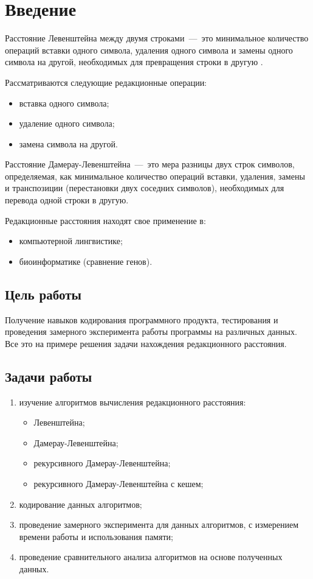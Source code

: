 \setcounter{page}{3}
\chapter*{Введение}

Расстояние Левенштейна между двумя строками~---~это минимальное количество операций вставки одного символа, удаления одного символа и замены одного символа на другой, необходимых для превращения строки в другую \cite{bib:1}.


Рассматриваются следующие редакционные операции:
\begin{itemize}
	\item вставка одного символа;
	\item удаление одного символа;
	\item замена символа на другой.
\end{itemize}

Расстояние Дамерау-Левенштейна~---~это мера разницы двух строк символов, определяемая, как минимальное количество операций вставки, удаления, замены и транспозиции (перестановки двух соседних символов), необходимых для перевода одной строки в другую.

Редакционные расстояния находят свое применение в:
\begin{itemize}
	\item компьютерной лингвистике;
	\item биоинформатике (сравнение генов).
\end{itemize}

\section*{Цель работы}

Получение навыков кодирования программного продукта, тестирования и проведения замерного эксперимента работы программы на различных данных. Все это на примере решения задачи нахождения редакционного расстояния.

\section*{Задачи работы}

\begin{enumerate}[label={\arabic*)}]
	\item изучение алгоритмов вычисления редакционного расстояния:
	\begin{itemize}
		\item Левенштейна;
		\item Дамерау-Левенштейна;
		\item рекурсивного Дамерау-Левенштейна;
		\item рекурсивного Дамерау-Левенштейна с кешем;
	\end{itemize}
	\item кодирование данных алгоритмов;
	\item проведение замерного эксперимента для данных алгоритмов, с измерением времени работы и использования памяти; 
	\item проведение сравнительного анализа алгоритмов на основе полученных данных.
\end{enumerate}

\newpage